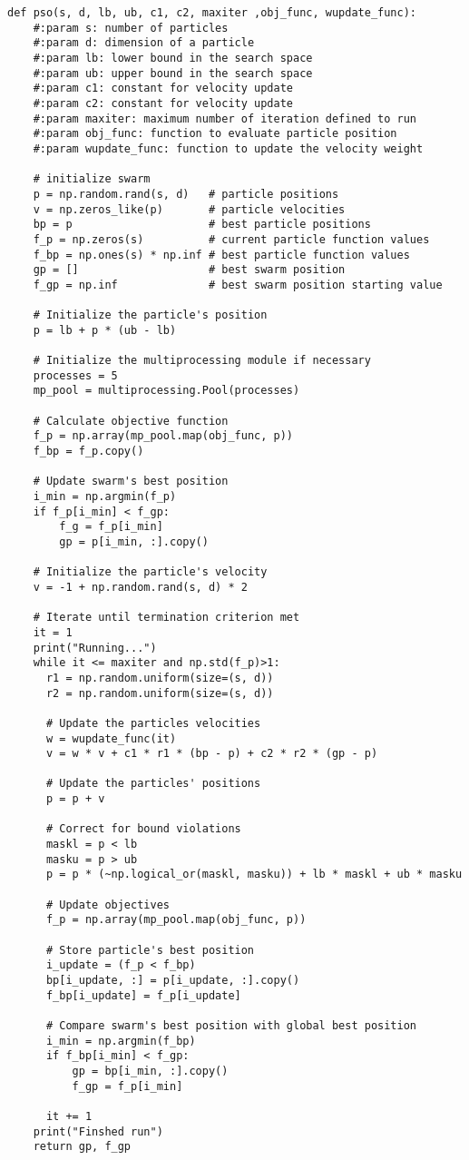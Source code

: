 \documentclass[letterpaper, 12pt]{article}
\begin{document}
\begin{lstlisting}
def pso(s, d, lb, ub, c1, c2, maxiter ,obj_func, wupdate_func):
    #:param s: number of particles
    #:param d: dimension of a particle
    #:param lb: lower bound in the search space
    #:param ub: upper bound in the search space
    #:param c1: constant for velocity update
    #:param c2: constant for velocity update
    #:param maxiter: maximum number of iteration defined to run
    #:param obj_func: function to evaluate particle position
    #:param wupdate_func: function to update the velocity weight

    # initialize swarm
    p = np.random.rand(s, d)   # particle positions
    v = np.zeros_like(p)       # particle velocities
    bp = p                     # best particle positions
    f_p = np.zeros(s)          # current particle function values
    f_bp = np.ones(s) * np.inf # best particle function values
    gp = []                    # best swarm position
    f_gp = np.inf              # best swarm position starting value

    # Initialize the particle's position
    p = lb + p * (ub - lb)

    # Initialize the multiprocessing module if necessary
    processes = 5
    mp_pool = multiprocessing.Pool(processes)

    # Calculate objective function
    f_p = np.array(mp_pool.map(obj_func, p))
    f_bp = f_p.copy()

    # Update swarm's best position
    i_min = np.argmin(f_p)
    if f_p[i_min] < f_gp:
        f_g = f_p[i_min]
        gp = p[i_min, :].copy()

    # Initialize the particle's velocity
    v = -1 + np.random.rand(s, d) * 2

    # Iterate until termination criterion met
    it = 1
    print("Running...")
    while it <= maxiter and np.std(f_p)>1:
      r1 = np.random.uniform(size=(s, d))
      r2 = np.random.uniform(size=(s, d))

      # Update the particles velocities
      w = wupdate_func(it)
      v = w * v + c1 * r1 * (bp - p) + c2 * r2 * (gp - p)

      # Update the particles' positions
      p = p + v

      # Correct for bound violations
      maskl = p < lb
      masku = p > ub
      p = p * (~np.logical_or(maskl, masku)) + lb * maskl + ub * masku

      # Update objectives
      f_p = np.array(mp_pool.map(obj_func, p))

      # Store particle's best position
      i_update = (f_p < f_bp)
      bp[i_update, :] = p[i_update, :].copy()
      f_bp[i_update] = f_p[i_update]

      # Compare swarm's best position with global best position
      i_min = np.argmin(f_bp)
      if f_bp[i_min] < f_gp:
          gp = bp[i_min, :].copy()
          f_gp = f_p[i_min]

      it += 1
    print("Finshed run")
    return gp, f_gp
\end{lstlisting}
\end{document}
